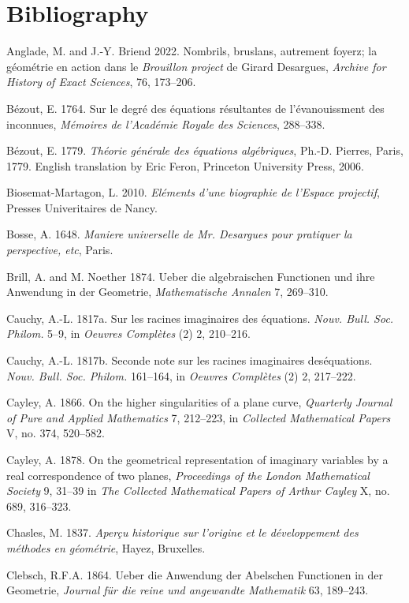 \documentclass[11pt]{article}
\begin{document}
\section{Bibliography}
\noindent Anglade, M. and J.-Y. Briend 2022. Nombrils, bruslans, autrement foyerz; la g\'eom\'etrie en action dans le \emph{Brouillon project} de Girard Desargues, \emph{Archive for History of Exact Sciences}, 76, 173--206.

\noindent B\'ezout, E. 1764. Sur le degr\'e des \'equations r\'esultantes de l'\'evanouissment des inconnues, \emph{M\'emoires de l'Acad\'emie Royale des Sciences}, 288--338.

\noindent B\'ezout, E. 1779. \emph{Th\'eorie g\'en\'erale des \'equations alg\'ebriques}, Ph.-D. Pierres, Paris, 1779. English translation by Eric Feron, Princeton University Press, 2006.

\noindent  Biosemat-Martagon, L. 2010. \emph{El\'ements d'une biographie de l'Espace projectif}, Presses Univeritaires de Nancy.

\noindent Bosse, A.  1648. \emph{Maniere universelle de Mr. Desargues pour pratiquer la perspective, etc}, Paris.

\noindent Brill, A. and M. Noether  1874.  Ueber die algebraischen Functionen und ihre Anwendung in der Geometrie, \emph{Mathematische Annalen} 7, 269--310.

\noindent Cauchy, A.-L. 1817a. Sur les racines imaginaires des \'equations. \emph{Nouv. Bull. Soc. Philom.} 5--9, in  \emph{Oeuvres Compl\`etes} (2) 2, 210--216.

 \noindent Cauchy, A.-L. 1817b. Seconde note sur les racines imaginaires des\'equa\-tions. \emph{Nouv. Bull. Soc. Philom.} 161--164, in \emph{Oeuvres Compl\`etes} (2) 2, 217--222.

\noindent Cayley, A. 1866. On the higher singularities of a plane curve, \emph{Quarterly Journal of Pure and Applied Mathematics} 7, 212--223, in \emph{Collected Mathematical Papers} V, no. 374, 520--582.

\noindent   Cayley, A. 1878. On the geometrical representation of imaginary variables by a real correspondence of two planes, \emph{Proceedings of the  London Mathematical Society} 9, 31--39 in \emph{The Collected Mathematical Papers of Arthur Cayley} X, no. 689, 316--323.

\noindent Chasles, M. 1837.  \emph{Aper\c{c}u historique sur l'origine et le d\'eveloppement des m\'ethodes en g\'eom\'etrie}, Hayez, Bruxelles. 

\noindent Clebsch, R.F.A. 1864.  Ueber die Anwendung der Abelschen Functionen in der Geometrie, \emph{Journal f\"ur die reine und angewandte Mathematik}  63, 189--243.
\end{document}
